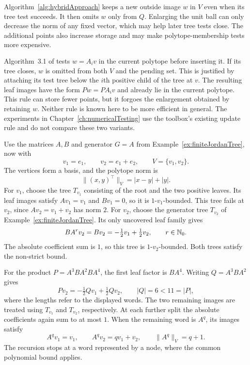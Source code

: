 \begin{remark}
    \label{rem:hybridVertexUpdates}
    Algorithm~\ref{alg:hybridApproach} keeps a new outside image $w$ in $V$ even when its tree test succeeds.
    It then omits $w$ only from $Q$.
    Enlarging the unit ball can only decrease the norm of any fixed vector, which may help later tree tests close.
    The additional points also increase storage and may make polytope-membership tests more expensive.

    Algorithm~3.1 of \citet{MejstrikReif2025HybridApproachJSR} tests $w=A_iv$ in the current polytope before inserting it.
    If its tree closes, $w$ is omitted from both $V$ and the pending set.
    This is justified by attaching its test tree below the $i$th positive child of the tree at $v$.
    The resulting leaf images have the form $Pw=PA_iv$ and already lie in the current polytope.
    This rule can store fewer points, but it forgoes the enlargement obtained by retaining $w$.
    Neither rule is known here to be more efficient in general.
    The experiments in Chapter~\ref{ch:numericalTesting} use the toolbox's existing update rule and do not compare these two variants.
\end{remark}

\begin{example}
    \label{ex:hybridVertexTrees}
    Use the matrices $A,B$ and generator $G=A$ from Example~\ref{ex:finiteJordanTree}, now with
    \[
        v_1=e_1,\qquad v_2=e_1+e_2,\qquad V=\{v_1,v_2\}.
    \]
    The vertices form a basis, and the polytope norm is
    \[
        \lVert(x,y)^\top\rVert_V=|x-y|+|y|.
    \]
    For $v_1$, choose the tree $T_{v_1}$ consisting of the root and the two positive leaves.
    Its leaf images satisfy $Av_1=v_1$ and $Bv_1=0$, so it is $1$-$v_1$-bounded.
    This tree fails at $v_2$, since $Av_2=v_1+v_2$ has norm $2$.
    For $v_2$, choose the generator tree $T_{v_2}$ of Example~\ref{ex:finiteJordanTree}.
    Its only uncovered leaf family gives
    \[
        BA^rv_2=Bv_2=-\tfrac12v_1+\tfrac12v_2,
        \qquad r\in\mathbb{N}_0.
    \]
    The absolute coefficient sum is $1$, so this tree is $1$-$v_2$-bounded.
    Both trees satisfy the non-strict bound.

    For the product $P=A^3BA^2BA^4$, the first leaf factor is $BA^4$.
    Writing $Q=A^3BA^2$ gives
    \[
        Pv_2=-\tfrac12Qv_1+\tfrac12Qv_2,
        \qquad |Q|=6<11=|P|,
    \]
    where the lengths refer to the displayed words.
    The two remaining images are treated using $T_{v_1}$ and $T_{v_2}$, respectively.
    At each further split the absolute coefficients again sum to at most $1$.
    When the remaining word is $A^q$, its images satisfy
    \[
        A^qv_1=v_1,\qquad A^qv_2=qv_1+v_2,
        \qquad \lVert A^q\rVert_V=q+1.
    \]
    The recursion stops at a word represented by a node, where the common polynomial bound applies.
\end{example}

